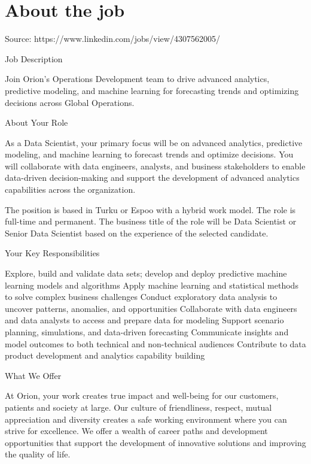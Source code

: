 \documentclass[a4paper,11pt]{article}
\begin{document}
	
	

	\section{About the job}

Source: https://www.linkedin.com/jobs/view/4307562005/

Job Description

Join Orion's Operations Development team to drive advanced analytics, predictive modeling, and machine learning for forecasting trends and optimizing decisions across Global Operations.

About Your Role

As a Data Scientist, your primary focus will be on advanced analytics, predictive modeling, and machine learning to forecast trends and optimize decisions. You will collaborate with data engineers, analysts, and business stakeholders to enable data-driven decision-making and support the development of advanced analytics capabilities across the organization.

The position is based in Turku or Espoo with a hybrid work model. The role is full-time and permanent. The business title of the role will be Data Scientist or Senior Data Scientist based on the experience of the selected candidate.

Your Key Responsibilities

Explore, build and validate data sets; develop and deploy predictive machine learning models and algorithms 
Apply machine learning and statistical methods to solve complex business challenges 
Conduct exploratory data analysis to uncover patterns, anomalies, and opportunities 
Collaborate with data engineers and data analysts to access and prepare data for modeling 
Support scenario planning, simulations, and data-driven forecasting 
Communicate insights and model outcomes to both technical and non-technical audiences 
Contribute to data product development and analytics capability building 

What We Offer

At Orion, your work creates true impact and well-being for our customers, patients and society at large.    Our culture of friendliness, respect, mutual appreciation and diversity creates a safe working environment where you can strive for excellence. We offer a wealth of career paths and development opportunities that support the development of innovative solutions and improving the quality of life.
\end{document}
